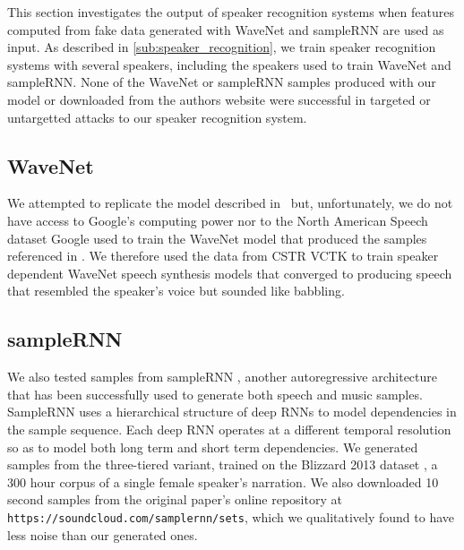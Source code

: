 This section investigates the output of speaker recognition systems when
features computed from fake data generated with WaveNet and sampleRNN are used as
input. As described in \ref{sub:speaker_recognition}, we train speaker
recognition systems with several speakers, including the speakers used to train
WaveNet and sampleRNN. None of the WaveNet or sampleRNN samples produced with
our model or downloaded from the authors website were successful in targeted or 
untargetted attacks to our speaker recognition system.

\subsection{WaveNet} %
\label{sub:res-WaveNet}
We attempted to replicate the model described in~\cite{van2016wavenet} but,
unfortunately, we do not have access to Google's computing power nor to the
North American Speech dataset Google used to train the WaveNet model that
produced the samples referenced in \cite{van2016wavenet}. We therefore used
the data from CSTR VCTK to train speaker dependent WaveNet speech synthesis
models that converged to producing speech that resembled the speaker's voice but
sounded like babbling. 
\subsection{sampleRNN} %
\label{sub:samplernn}
We also tested samples from sampleRNN \cite{mehri2016samplernn}, another
autoregressive architecture that has been successfully used to generate both
speech and music samples. SampleRNN uses a hierarchical structure of deep RNNs
to model dependencies in the sample sequence. Each deep RNN operates at a
different temporal resolution so as to model both long term and short term
dependencies. We generated samples from the three-tiered variant, trained on the
Blizzard 2013 dataset \cite{prahallad2013blizzard}, a 300 hour corpus of a
single female speaker's narration. We also downloaded 10 second samples from the
original paper's online repository at
\texttt{https://soundcloud.com/samplernn/sets}, which we qualitatively found to
have less noise than our generated ones. 
